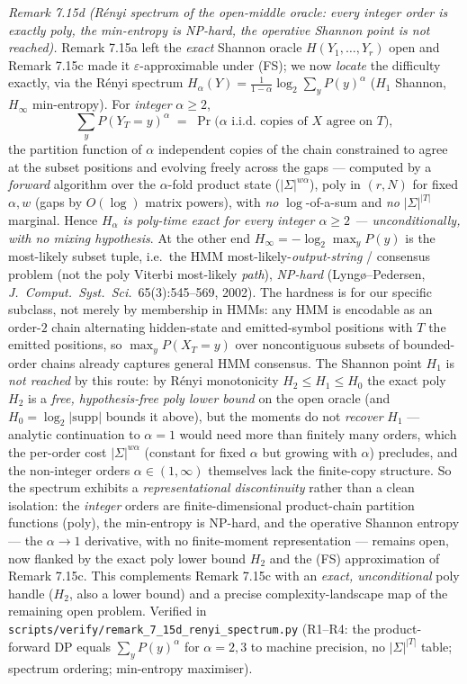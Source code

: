 \documentclass[
]{article}
\begin{document}
\emph{Remark 7.15d (R\'enyi spectrum of the open-middle oracle: every integer order
is exactly poly, the min-entropy is NP-hard, the operative Shannon point is not
reached).} Remark 7.15a
left the \emph{exact} Shannon oracle $H(Y_1,\dots,Y_r)$ open and Remark 7.15c made it
$\varepsilon$-approximable under (FS); we now \emph{locate} the difficulty exactly,
via the R\'enyi spectrum $H_\alpha(Y)=\tfrac1{1-\alpha}\log_2\sum_y P(y)^\alpha$
($H_1$ Shannon, $H_\infty$ min-entropy). For \emph{integer} $\alpha\ge2$,
\[
\sum_y P(Y_T{=}y)^\alpha \;=\; \Pr\bigl(\alpha\text{ i.i.d.\ copies of }X
\text{ agree on }T\bigr),
\]
the partition function of $\alpha$ independent copies of the chain constrained to
agree at the subset positions and evolving freely across the gaps --- computed by a
\emph{forward} algorithm over the $\alpha$-fold product state ($|\Sigma|^{w\alpha}$),
poly in $(r,N)$ for fixed $\alpha,w$ (gaps by $O(\log)$ matrix powers), with
\emph{no} $\log$-of-a-sum and \emph{no} $|\Sigma|^{|T|}$ marginal. Hence \emph{$H_\alpha$
is poly-time exact for every integer $\alpha\ge2$ --- unconditionally, with no mixing
hypothesis}. At the other end $H_\infty=-\log_2\max_y P(y)$ is the most-likely subset
tuple, i.e.\ the HMM most-likely-\emph{output-string} / consensus problem (not the
poly Viterbi most-likely \emph{path}), \emph{NP-hard} (Lyng\o{}--Pedersen, \emph{J.\
Comput.\ Syst.\ Sci.}\ 65(3):545--569, 2002). The hardness is for our specific
subclass, not merely by membership in HMMs: any HMM is encodable as an order-$2$
chain alternating hidden-state and emitted-symbol positions with $T$ the emitted
positions, so $\max_y P(X_T{=}y)$ over noncontiguous subsets of bounded-order chains
already captures general HMM consensus. The Shannon point $H_1$ is \emph{not reached}
by this route: by R\'enyi monotonicity $H_2\le H_1\le H_0$ the exact poly $H_2$ is a
\emph{free, hypothesis-free poly lower bound} on the open oracle (and
$H_0=\log_2|\mathrm{supp}|$ bounds it above), but the moments do not \emph{recover}
$H_1$ --- analytic continuation to $\alpha=1$ would need more than finitely many
orders, which the per-order cost $|\Sigma|^{w\alpha}$ (constant for fixed $\alpha$
but growing with $\alpha$) precludes, and the non-integer orders $\alpha\in(1,\infty)$
themselves lack the finite-copy structure. So the spectrum exhibits a
\emph{representational discontinuity} rather than a clean isolation: the \emph{integer}
orders are finite-dimensional product-chain partition functions (poly), the
min-entropy is NP-hard, and the operative Shannon entropy --- the $\alpha\to1$
derivative, with no finite-moment representation --- remains open, now flanked by the
exact poly lower bound $H_2$ and the (FS) approximation of Remark 7.15c. This
complements Remark 7.15c with an \emph{exact, unconditional} poly handle ($H_2$, also
a lower bound) and a precise complexity-landscape map of the remaining open problem.
Verified in
\texttt{scripts/verify/remark\_7\_15d\_renyi\_spectrum.py} (R1--R4: the
product-forward DP equals $\sum_y P(y)^\alpha$ for $\alpha=2,3$ to machine precision,
no $|\Sigma|^{|T|}$ table; spectrum ordering; min-entropy maximiser).
\end{document}
